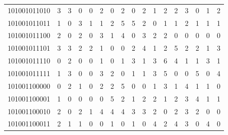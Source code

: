 \documentclass[10pt,a4paper]{article}
\begin{document}
\begin{longtable}{ |c|c|c|c|c|c|c|c|c|c|c|c|c|c|c|c|c| }
    101001011010              & 3                            & 3                                & 0                            & 0                              & 2   & 0   & 2   & 0   & 2   & 1   & 2   & 2   & 3   & 0   & 1   & 2   \\
    101001011011              & 1                            & 0                                & 3                            & 1                              & 1   & 2   & 5   & 5   & 2   & 0   & 1   & 1   & 2   & 1   & 1   & 1   \\
    101001011100              & 2                            & 0                                & 2                            & 0                              & 3   & 1   & 4   & 0   & 3   & 2   & 2   & 0   & 0   & 0   & 0   & 0   \\
    101001011101              & 3                            & 3                                & 2                            & 2                              & 1   & 0   & 0   & 2   & 4   & 1   & 2   & 5   & 2   & 2   & 1   & 3   \\
    101001011110              & 0                            & 2                                & 0                            & 0                              & 1   & 0   & 1   & 3   & 1   & 3   & 6   & 4   & 1   & 1   & 3   & 1   \\
    101001011111              & 1                            & 3                                & 0                            & 0                              & 3   & 2   & 0   & 1   & 1   & 3   & 5   & 0   & 0   & 5   & 0   & 4   \\
    101001100000              & 0                            & 2                                & 1                            & 0                              & 2   & 2   & 5   & 0   & 0   & 1   & 3   & 1   & 4   & 1   & 1   & 0   \\
    101001100001              & 1                            & 0                                & 0                            & 0                              & 0   & 5   & 2   & 1   & 2   & 2   & 1   & 2   & 3   & 4   & 1   & 1   \\
    101001100010              & 2                            & 0                                & 2                            & 1                              & 4   & 4   & 4   & 3   & 3   & 2   & 0   & 2   & 3   & 2   & 0   & 0   \\
    101001100011              & 2                            & 1                                & 1                            & 0                              & 0   & 1   & 0   & 1   & 0   & 4   & 2   & 4   & 3   & 0   & 4   & 0   \\

\end{longtable}
\end{document}
